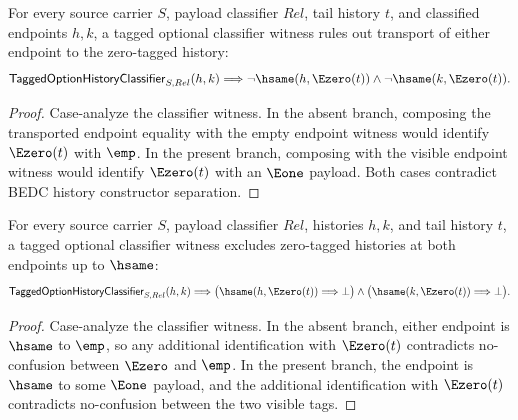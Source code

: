 \begin{theorem}
\label{thm:tagged-option-history-classifier-endpoint-transport-e0-absurd}
For every source carrier $S$, payload classifier $Rel$, tail history $t$, and
classified endpoints $h,k$, a tagged optional classifier witness rules out
transport of either endpoint to the zero-tagged history:
$$
\mathsf{TaggedOptionHistoryClassifier}_{S,Rel}(h,k)
\Longrightarrow
\neg\hsame(h,\Ezero(t))\land\neg\hsame(k,\Ezero(t)).
$$
\end{theorem}
\begin{proof}
Case-analyze the classifier witness. In the absent branch, composing the
transported endpoint equality with the empty endpoint witness would identify
$\Ezero(t)$ with $\emp$. In the present branch, composing with the visible
endpoint witness would identify $\Ezero(t)$ with an $\Eone$ payload. Both cases
contradict BEDC history constructor separation.
\end{proof}

\begin{theorem}
\label{thm:tagged-option-history-classifier-zero-endpoint-exclusion}
For every source carrier $S$, payload classifier $Rel$, histories $h,k$, and
tail history $t$, a tagged optional classifier witness excludes zero-tagged
histories at both endpoints up to $\hsame$:
$$
\mathsf{TaggedOptionHistoryClassifier}_{S,Rel}(h,k)
\Longrightarrow
\bigl(\hsame(h,\Ezero(t))\Longrightarrow\bot\bigr)
\wedge
\bigl(\hsame(k,\Ezero(t))\Longrightarrow\bot\bigr).
$$
\end{theorem}
\begin{proof}
Case-analyze the classifier witness. In the absent branch, either endpoint is
$\hsame$ to $\emp$, so any additional identification with $\Ezero(t)$
contradicts no-confusion between $\Ezero$ and $\emp$. In the present branch,
the endpoint is $\hsame$ to some $\Eone$ payload, and the additional
identification with $\Ezero(t)$ contradicts no-confusion between the two
visible tags.
\end{proof}

